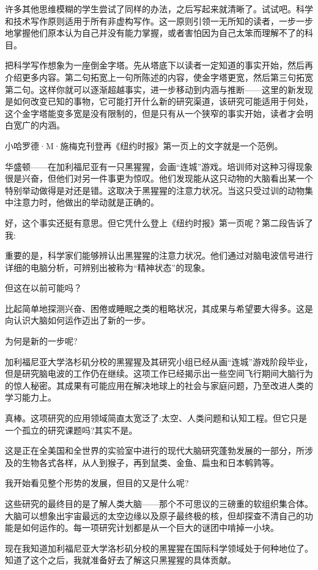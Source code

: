 许多其他思维模糊的学生尝试了同样的办法，之后写起来就清晰了。试试吧。科学和技术写作原则适用于所有非虚构写作。这一原则引领一无所知的读者，一步一步地掌握他们原本认为自己并没有能力掌握，或者害怕因为自己太笨而理解不了的科目。

把科学写作想象为一座倒金字塔。先从塔底下以读者一定知道的事实开始，然后再介绍更多内容。第二句拓宽上一句所陈述的内容，使金字塔更宽，然后第三句拓宽第二句。这样你就可以逐渐超越事实，进一步移动到内涵与推断——这里的新发现是如何改变已知的事物，它可能打开什么新的研究渠道，该研究可能适用于何处，这个金字塔能变多宽是没有限制的，但是只有从一个狭窄的事实开始，读者才会明白宽广的内涵。


小哈罗德·M·施梅克刊登再《纽约时报》第一页上的文字就是一个范例。

华盛顿——在加利福尼亚有一只黑猩猩，会画“连城”游戏。培训师对这种习得现象很是兴奋，但他们对另一件事更为惊叹。他们发现能从这只动物的大脑看出某一个特别举动做得是对还是错。这取决于黑猩猩的注意力状况。当这只受过训的动物集中注意力时，他做出的举动就是正确的。

好，这个事实还挺有意思。但它凭什么登上《纽约时报》第一页呢？第二段告诉了我:

重要的是，科学家们能够辨认出黑猩猩的注意力状况。他们通过对脑电波信号进行详细的电脑分析，可辨别出被称为“精神状态”的现象。

但这在以前可能吗？

比起简单地探测兴奋、困倦或睡眠之类的粗略状况，其成果与希望要大得多。这是向认识大脑如何运作迈出了新的一步。

为何是新的一步呢?

加利福尼亚大学洛杉矶分校的黑猩猩及其研究小组已经从画“连城”游戏阶段毕业，但是研究脑电波的工作仍在继续。这项工作已经揭示出一些空间飞行期间大脑行为的惊人秘密。其成果有可能应用在解决地球上的社会与家庭问题，乃至改进人类的学习能力上。

真棒。这项研究的应用领域简直太宽泛了:太空、人类问题和认知工程。但它只是一个孤立的研究课题吗?其实不是。

这是正在全美国和全世界的实验室中进行的现代大脑研究蓬勃发展的一部分，所涉及的生物各式各样，从人到猴子，再到鼠类、金鱼、扁虫和日本鹌鹑等。

我开始看见整个形势的发展，但目的又是什么呢?

这些研究的最终目的是了解人类大脑——那个不可思议的三磅重的软组织集合体。大脑可以想象出宇宙最远的太空边缘以及原子最终极的核，但却探查不清自己的功能是如何运作的。每一项研究计划都是从一个巨大的谜团中啃掉一小块。

现在我知道加利福尼亚大学洛杉矶分校的黑猩猩在国际科学领域处于何种地位了。知道了这个之后，我就准备好去了解这只黑猩猩的具体贡献。

